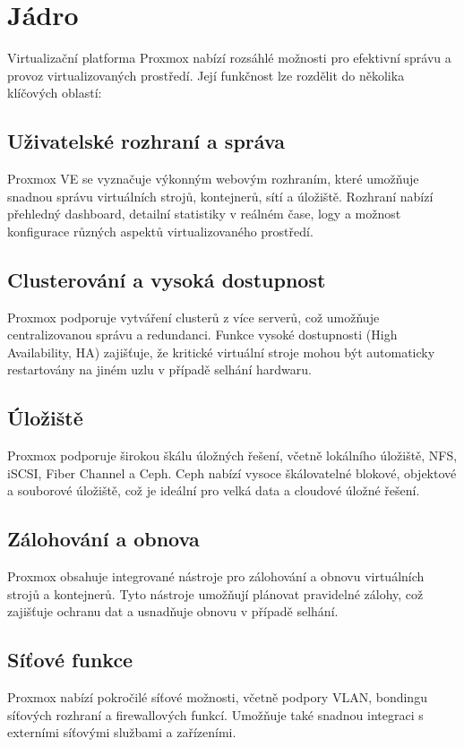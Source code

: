 \chapter{Jádro}
Virtualizační platforma Proxmox nabízí rozsáhlé možnosti pro efektivní správu a provoz virtualizovaných prostředí. Její funkčnost lze rozdělit do několika klíčových oblastí:

\section{Uživatelské rozhraní a správa}
Proxmox VE se vyznačuje výkonným webovým rozhraním, které umožňuje snadnou správu virtuálních strojů, kontejnerů, sítí a úložiště. Rozhraní nabízí přehledný dashboard, detailní statistiky v reálném čase, logy a možnost konfigurace různých aspektů virtualizovaného prostředí.

\section{Clusterování a vysoká dostupnost}
Proxmox podporuje vytváření clusterů z více serverů, což umožňuje centralizovanou správu a redundanci. Funkce vysoké dostupnosti (High Availability, HA) zajišťuje, že kritické virtuální stroje mohou být automaticky restartovány na jiném uzlu v případě selhání hardwaru.

\section{Úložiště}
Proxmox podporuje širokou škálu úložných řešení, včetně lokálního úložiště, NFS, iSCSI, Fiber Channel a Ceph. Ceph nabízí vysoce škálovatelné blokové, objektové a souborové úložiště, což je ideální pro velká data a cloudové úložné řešení.

\section{Zálohování a obnova}
Proxmox obsahuje integrované nástroje pro zálohování a obnovu virtuálních strojů a kontejnerů. Tyto nástroje umožňují plánovat pravidelné zálohy, což zajišťuje ochranu dat a usnadňuje obnovu v případě selhání.

\section{Síťové funkce}
Proxmox nabízí pokročilé síťové možnosti, včetně podpory VLAN, bondingu síťových rozhraní a firewallových funkcí. Umožňuje také snadnou integraci s externími síťovými službami a zařízeními.

